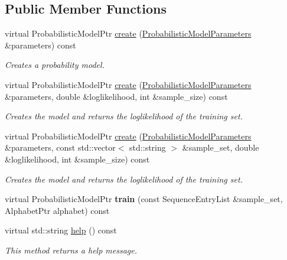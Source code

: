 \subsection*{Public Member Functions}
\begin{DoxyCompactItemize}
\item 
virtual Probabilistic\+Model\+Ptr \hyperlink{classtops_1_1TrainDiscreteIIDModel_a072a44dfaeb57cdffea9988f7a053bb8}{create} (\hyperlink{classtops_1_1ProbabilisticModelParameters}{Probabilistic\+Model\+Parameters} \&parameters) const
\begin{DoxyCompactList}\small\item\em Creates a probability model. \end{DoxyCompactList}\item 
\mbox{\label{classtops_1_1TrainDiscreteIIDModel_ad21108b84ecf8a43251800a5b7954bae}} 
virtual Probabilistic\+Model\+Ptr \hyperlink{classtops_1_1TrainDiscreteIIDModel_ad21108b84ecf8a43251800a5b7954bae}{create} (\hyperlink{classtops_1_1ProbabilisticModelParameters}{Probabilistic\+Model\+Parameters} \&parameters, double \&loglikelihood, int \&sample\+\_\+size) const
\begin{DoxyCompactList}\small\item\em Creates the model and returns the loglikelihood of the training set. \end{DoxyCompactList}\item 
\mbox{\label{classtops_1_1TrainDiscreteIIDModel_ad140dc14d38d849bc88cdf21a6e4e14c}} 
virtual Probabilistic\+Model\+Ptr \hyperlink{classtops_1_1TrainDiscreteIIDModel_ad140dc14d38d849bc88cdf21a6e4e14c}{create} (\hyperlink{classtops_1_1ProbabilisticModelParameters}{Probabilistic\+Model\+Parameters} \&parameters, const std\+::vector$<$ std\+::string $>$ \&sample\+\_\+set, double \&loglikelihood, int \&sample\+\_\+size) const
\begin{DoxyCompactList}\small\item\em Creates the model and returns the loglikelihood of the training set. \end{DoxyCompactList}\item 
\mbox{\label{classtops_1_1TrainDiscreteIIDModel_a365dbb309010a1530c3103b9951df66c}} 
virtual Probabilistic\+Model\+Ptr {\bfseries train} (const Sequence\+Entry\+List \&sample\+\_\+set, Alphabet\+Ptr alphabet) const
\item 
\mbox{\label{classtops_1_1TrainDiscreteIIDModel_a73e2aebefe4d72698a4f22dfa5246ba2}} 
virtual std\+::string \hyperlink{classtops_1_1TrainDiscreteIIDModel_a73e2aebefe4d72698a4f22dfa5246ba2}{help} () const
\begin{DoxyCompactList}\small\item\em This method returns a help message. \end{DoxyCompactList}\end{DoxyCompactItemize}


